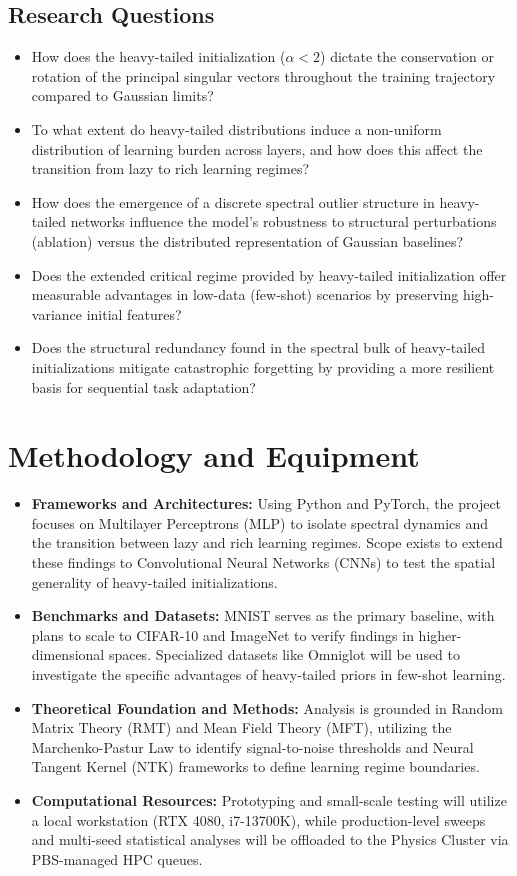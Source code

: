 \documentclass[11pt,a4paper]{article}
\begin{document}
\subsection{Research Questions}
\begin{itemize}
\item How does the heavy-tailed initialization ($\alpha < 2$) dictate the conservation or rotation of the principal singular vectors throughout the training trajectory compared to Gaussian limits?
\item To what extent do heavy-tailed distributions induce a non-uniform distribution of learning burden across layers, and how does this affect the transition from lazy to rich learning regimes?
\item How does the emergence of a discrete spectral outlier structure in heavy-tailed networks influence the model's robustness to structural perturbations (ablation) versus the distributed representation of Gaussian baselines?
\item Does the extended critical regime provided by heavy-tailed initialization offer measurable advantages in low-data (few-shot) scenarios by preserving high-variance initial features?
\item Does the structural redundancy found in the spectral bulk of heavy-tailed initializations mitigate catastrophic forgetting by providing a more resilient basis for sequential task adaptation?
\end{itemize}
\pagebreak
\section{Methodology and Equipment}
\begin{itemize}
\item \textbf{Frameworks and Architectures:} Using Python and PyTorch, the project focuses on Multilayer Perceptrons (MLP) to isolate spectral dynamics and the transition between lazy and rich learning regimes. Scope exists to extend these findings to Convolutional Neural Networks (CNNs) to test the spatial generality of heavy-tailed initializations.
\item \textbf{Benchmarks and Datasets:} MNIST serves as the primary baseline, with plans to scale to CIFAR-10 and ImageNet to verify findings in higher-dimensional spaces. Specialized datasets like Omniglot will be used to investigate the specific advantages of heavy-tailed priors in few-shot learning.
\item \textbf{Theoretical Foundation and Methods:} Analysis is grounded in Random Matrix Theory (RMT) and Mean Field Theory (MFT), utilizing the Marchenko-Pastur Law to identify signal-to-noise thresholds and Neural Tangent Kernel (NTK) frameworks to define learning regime boundaries.
\item \textbf{Computational Resources:} Prototyping and small-scale testing will utilize a local workstation (RTX 4080, i7-13700K), while production-level sweeps and multi-seed statistical analyses will be offloaded to the Physics Cluster via PBS-managed HPC queues.
\end{itemize}
\end{document}
